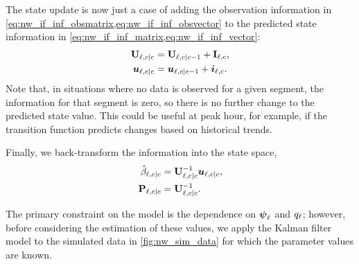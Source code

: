 The state update is now just a case of adding the observation information in \cref{eq:nw_if_inf_obsmatrix,eq:nw_if_inf_obsvector} to the predicted state information in \cref{eq:nw_if_inf_matrix,eq:nw_if_inf_vector}:
\begin{equation}
\label{eq:nw_if_update}
\begin{split}
\mathbf{U}_{\ell,c|c} &= \mathbf{U}_{\ell,c|c-1} + \mathbf{I}_{\ell,c}, \\
\boldsymbol{u}_{\ell,c|c} &= \boldsymbol{u}_{\ell,c|c-1} + \boldsymbol{i}_{\ell,c}.
\end{split}
\end{equation}
Note that, in situations where no data is observed for a given segment, the information for that segment is zero, so there is no further change to the predicted state value. This could be useful at peak hour, for example, if the transition function predicts changes based on historical trends.


Finally, we back-transform the information into the state space,
\begin{equation}
\label{eq:nw_if_statespace}
\begin{split}
\hat{\beta}_{\ell,c|c} &= \mathbf{U}_{\ell,c|c}^{-1} \boldsymbol{u}_{\ell,c|c}, \\
\mathbf{P}_{\ell,c|c} &= \mathbf{U}_{\ell,c|c}^{-1}.
\end{split}
\end{equation}

The primary constraint on the model is the dependence on $\mathbf{\boldsymbol{\psi}}_{\ell}$ and $q_{\ell}$; however, before considering the estimation of these values, we apply the Kalman filter model to the simulated data in \cref{fig:nw_sim_data} for which the parameter values are known.


